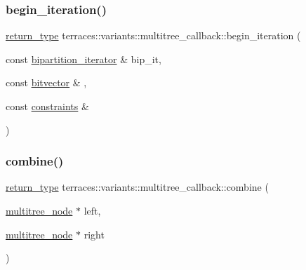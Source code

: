 \subsubsection{\texorpdfstring{begin\+\_\+iteration()}{begin\_iteration()}}
{\footnotesize\ttfamily \hyperlink{classterraces_1_1variants_1_1multitree__callback_a31341dbe798daa06859cd3e0ab354bf1}{return\+\_\+type} terraces\+::variants\+::multitree\+\_\+callback\+::begin\+\_\+iteration (\begin{DoxyParamCaption}\item[{const \hyperlink{classterraces_1_1bipartition__iterator}{bipartition\+\_\+iterator} \&}]{bip\+\_\+it,  }\item[{const \hyperlink{namespaceterraces_a1b526fb554dff829f7ad51eb21d5ed06}{bitvector} \&}]{,  }\item[{const \hyperlink{namespaceterraces_a6f603ffd30ed4d902fce6424492e0581}{constraints} \&}]{ }\end{DoxyParamCaption})\hspace{0.3cm}{\ttfamily [inline]}}

\mbox{\label{classterraces_1_1variants_1_1multitree__callback_a9b54c60bdca2c762bc8b358b9173eb69}} 
\subsubsection{\texorpdfstring{combine()}{combine()}}
{\footnotesize\ttfamily \hyperlink{classterraces_1_1variants_1_1multitree__callback_a31341dbe798daa06859cd3e0ab354bf1}{return\+\_\+type} terraces\+::variants\+::multitree\+\_\+callback\+::combine (\begin{DoxyParamCaption}\item[{\hyperlink{structterraces_1_1multitree__node}{multitree\+\_\+node} $\ast$}]{left,  }\item[{\hyperlink{structterraces_1_1multitree__node}{multitree\+\_\+node} $\ast$}]{right }\end{DoxyParamCaption})\hspace{0.3cm}{\ttfamily [inline]}}

\mbox{\label{classterraces_1_1variants_1_1multitree__callback_a8fb6fab8ddad07bfdd92dd832a8bf917}} 
